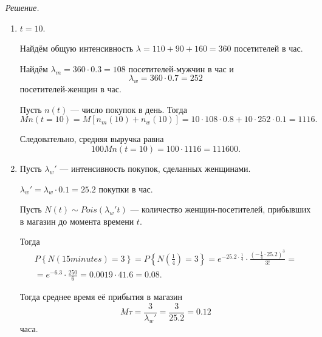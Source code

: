 \textit{Решение.}
\begin{enumerate}[label=\alph*)]
  \item $t = 10$.

  Найдём общую интенсивность $ \lambda = 110 + 90 + 160 = 360$ посетителей в час.

  Найдём $ \lambda_m = 360 \cdot 0.3 = 108$ посетителей-мужчин в час и
  $$ \lambda_w =
    360 \cdot 0.7 =
    252$$
  посетителей-женщин в час.

  Пусть $n \left( t \right) $ --- число покупок в день.
  Тогда
  $$Mn \left( t = 10 \right) =
    M \left[ n_m \left( 10 \right) + n_w \left( 10 \right) \right] =
    10 \cdot 108 \cdot 0.8 + 10 \cdot 252 \cdot 0.1 =
    1116.$$

  Следовательно, средняя выручка равна
  $$100Mn \left( t = 10 \right) =
    100 \cdot 1116 =
    111600.$$
  \item Пусть $ \lambda_w'$ --- интенсивность покупок, сделанных женщинами.

  $ \lambda_w' = \lambda_w \cdot 0.1 = 25.2$ покупки в час.

  Пусть $N \left( t \right) \sim Pois \left( \lambda_w' t \right) $ ---
  количество женщин-посетителей, прибывших в магазин до момента времени $t$.

  Тогда
  \begin{gather*}
    P \left\{ N \left( 15 minutes \right) = 3 \right\} =
    P \left\{ N \left( \frac{1}{4} \right) = 3 \right\} =
    e^{-25.2 \cdot \frac{1}{4}} \cdot \frac{ \left( -\frac{1}{4} \cdot 25.2 \right)^3}{3!} = \\
    = e^{-6.3} \cdot \frac{250}{6} =
    0.0019 \cdot 41.6 =
    0.08.
  \end{gather*}

  Тогда среднее время её прибытия в магазин
  $$M \tau =
    \frac{3}{ \lambda_w'} =
    \frac{3}{25.2} =
    0.12$$
  часа.
\end{enumerate}
